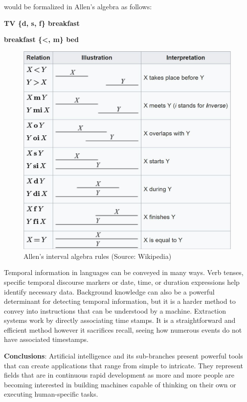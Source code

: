 \documentclass{report}
\begin{document}
 would be formalized in Allen's algebra as follows:\\

\centerline{\textbf{TV \{d, s, f\} breakfast}}
\centerline{\textbf{breakfast \{\textless, m\} bed}}

\begin{figure}[h]
\caption{Allen's interval algebra rules (Source: Wikipedia)}
\vspace*{1cm}
\centerline{\includegraphics[scale=1]{allen}}
\end{figure}

Temporal information in languages can be conveyed in many ways. Verb tenses, specific temporal discourse markers or date, time, or duration expressions help identify necessary data. Background knowledge can also be a powerful determinant for detecting temporal information, but it is a harder method to convey into instructions that can be understood by a machine. Extraction systems work by directly associating time stamps. It is a straightforward and efficient method however it sacrifices recall, seeing how numerous events do not have associated timestamps.


\textbf{Conclusions}: Artificial intelligence and its sub-branches present powerful tools that can create applications that range from simple to intricate. They represent fields that are in continuous rapid development as more and more people are becoming interested in building machines capable of thinking on their own or executing human-specific tasks.
\newpage
\end{document}
